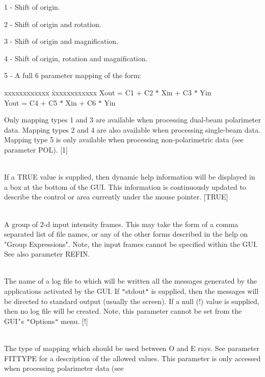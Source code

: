 \documentclass[twoside,11pt]{article}
\renewcommand{\_}{\texttt{\symbol{95}}}
\newcommand{\sstsubsection}[1]{ \item[{#1}] \mbox{} \\}
\newcommand{\sstsubsection}[1]{\item[{#1}]}
\begin{document}
{{{         1 - Shift of origin.

         2 - Shift of origin and rotation.

         3 - Shift of origin and magnification.

         4 - Shift of origin, rotation and magnification.

         5 - A full 6 parameter mapping of the form:

\begin{tabbing}
 xxxxxxxxxxxx \= xxxxxxxxxxxx \kill
              \>  X\_out = C1  $+$  C2 $*$ X\_in  $+$  C3 $*$ Y\_in \\
              \>  Y\_out = C4  $+$  C5 $*$ X\_in  $+$  C6 $*$ Y\_in
\end{tabbing}

         Only mapping types 1 and 3 are available when processing
         dual-beam polarimeter data. Mapping types 2 and 4 are also
         available when processing single-beam data. Mapping type 5 
         is only available when processing non-polarimetric data (see 
         parameter POL). [1]
      }
      \sstsubsection{
         HELPAREA = \_LOGICAL (Update)
      }{
         If a TRUE value is supplied, then dynamic help information will be
         displayed in a box at the bottom of the GUI. This information
         is continuously updated to describe the control or area currently
         under the mouse pointer. [TRUE]
      }
      \sstsubsection{
         IN = NDF (Read)
      }{
         A group of 2-d input intensity frames. This may take the form of a 
         comma separated list of file names, or any of the other forms 
         described in the help on "Group Expressions". Note, the input frames 
         cannot be specified within the GUI. See also parameter REFIN.
      }
      \sstsubsection{
         LOGFILE = LITERAL (Read)
      }{
         The name of a log file to which will be written all the messages
         generated by the applications activated by the GUI. If {\tt "}stdout{\tt "}
         is supplied, then the messages will be directed to standard
         output (usually the screen). If a null (!) value is supplied, then
         no log file will be created. Note, this parameter cannot be set
         from the GUI{\tt '}s {\tt "}Options{\tt "} menu. [!]
      }
      \sstsubsection{
         OEFITTYPE = \_INTEGER (Update)
      }{
         The type of mapping which should be used between O and E rays. See
         parameter FITTYPE for a description of the allowed values. This
         parameter is only accessed when processing polarimeter data (see
}}}
\end{document}
